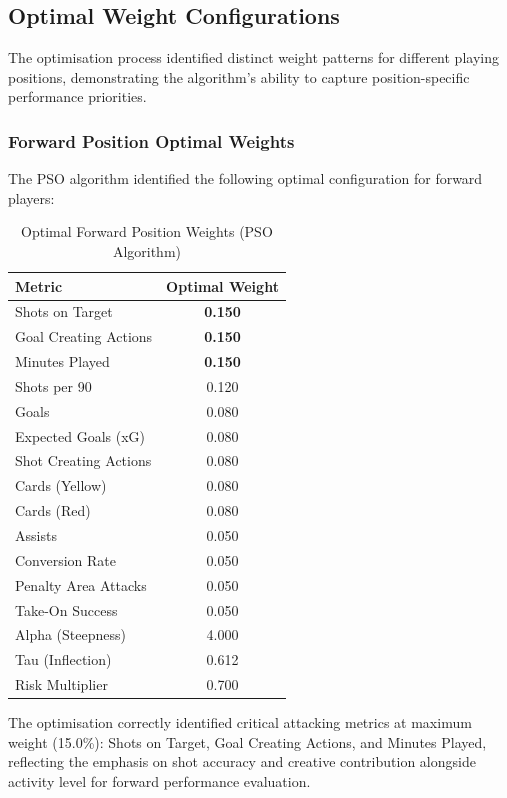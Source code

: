 \subsection{Optimal Weight Configurations}

The optimisation process identified distinct weight patterns for different playing positions, demonstrating the algorithm's ability to capture position-specific performance priorities.

\subsubsection{Forward Position Optimal Weights}

The PSO algorithm identified the following optimal configuration for forward players:

\begin{table}[H]
\centering
\caption{Optimal Forward Position Weights (PSO Algorithm)}
\label{tab:forward_weights}
\begin{tabular}{lc}
\toprule
\textbf{Metric} & \textbf{Optimal Weight} \\
\midrule
Shots on Target & \textbf{0.150} \\
Goal Creating Actions & \textbf{0.150} \\
Minutes Played & \textbf{0.150} \\
Shots per 90 & 0.120 \\
Goals & 0.080 \\
Expected Goals (xG) & 0.080 \\
Shot Creating Actions & 0.080 \\
Cards (Yellow) & 0.080 \\
Cards (Red) & 0.080 \\
Assists & 0.050 \\
Conversion Rate & 0.050 \\
Penalty Area Attacks & 0.050 \\
Take-On Success & 0.050 \\
\midrule
Alpha (Steepness) & 4.000 \\
Tau (Inflection) & 0.612 \\
Risk Multiplier & 0.700 \\
\bottomrule
\end{tabular}
\end{table}

The optimisation correctly identified critical attacking metrics at maximum weight (15.0\%): Shots on Target, Goal Creating Actions, and Minutes Played, reflecting the emphasis on shot accuracy and creative contribution alongside activity level for forward performance evaluation.

